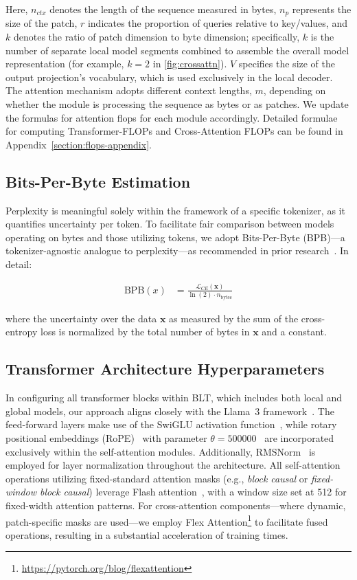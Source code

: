 Here, $n_{ctx}$ denotes the length of the sequence measured in bytes, $n_p$ represents the size of the patch, $r$ indicates the proportion of queries relative to key/values, and $k$ denotes the ratio of patch dimension to byte dimension; specifically, $k$ is the number of separate local model segments combined to assemble the overall model representation (for example, $k=2$ in \autoref{fig:crossattn}). $V$ specifies the size of the output projection's vocabulary, which is used exclusively in the local decoder. The attention mechanism adopts different context lengths, $m$, depending on whether the module is processing the sequence as bytes or as patches. We update the formulas for attention flops for each module accordingly. Detailed formulae for computing Transformer-FLOPs and Cross-Attention FLOPs can be found in Appendix~\ref{section:flops-appendix}.

\subsection{Bits-Per-Byte Estimation} Perplexity is meaningful solely within the framework of a specific tokenizer, as it quantifies uncertainty per token. To facilitate fair comparison between models operating on bytes and those utilizing tokens, we adopt Bits-Per-Byte (BPB)—a tokenizer-agnostic analogue to perplexity—as recommended in prior research~\citep{xue2022byt5, yu2023megabyte, wang2024mambabyte}. In detail:

\begin{align}
    \text{BPB}(x)&= \frac{\mathcal{L}_{CE}(\pmb{x})}{\ln(2)\cdot n_{\text{bytes}}}
\end{align}

where the uncertainty over the data $\pmb{x}$ as measured by the sum of the cross-entropy loss is normalized by the total number of bytes in $\pmb{x}$ and a constant. 

\subsection{Transformer Architecture Hyperparameters} 

In configuring all transformer blocks within {\textsc BLT}, which includes both local and global models, our approach aligns closely with the Llama~3 framework~\citep{dubey2024llama}. The feed-forward layers make use of the SwiGLU activation function~\citep{swiglu}, while rotary positional embeddings (RoPE)~\citep{RoPe} with parameter $\theta=500000$~\citep{xiong2024effective} are incorporated exclusively within the self-attention modules. Additionally, RMSNorm~\citep{RMSNorm} is employed for layer normalization throughout the architecture. All self-attention operations utilizing fixed-standard attention masks (e.g., \textit{block causal} or \textit{fixed-window block causal}) leverage Flash attention~\citep{dao2022flashattention}, with a window size set at 512 for fixed-width attention patterns. For cross-attention components—where dynamic, patch-specific masks are used—we employ Flex Attention\footnote{\url{https://pytorch.org/blog/flexattention}} to facilitate fused operations, resulting in a substantial acceleration of training times.

